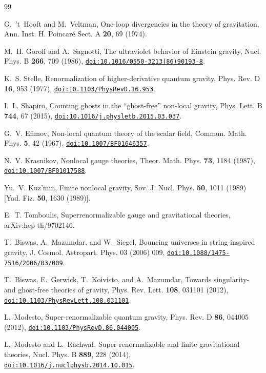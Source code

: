 \documentclass[a4paper,11pt]{article}
\newcommand{\doilink}[1]{\href{https://doi.org/#1}{\nolinkurl{doi:#1}}}
\begin{document}
\begin{thebibliography}{99}

G.~'t~Hooft and M.~Veltman, One-loop divergencies in the theory of gravitation, Ann. Inst. H. Poincar\'e Sect. A \textbf{20}, 69 (1974).

M.~H. Goroff and A.~Sagnotti, The ultraviolet behavior of Einstein gravity, Nucl. Phys. B \textbf{266}, 709 (1986), \doilink{10.1016/0550-3213(86)90193-8}.

K.~S. Stelle, Renormalization of higher-derivative quantum gravity, Phys. Rev. D \textbf{16}, 953 (1977), \doilink{10.1103/PhysRevD.16.953}.

I.~L. Shapiro, Counting ghosts in the ``ghost-free'' non-local gravity, Phys. Lett. B \textbf{744}, 67 (2015), \doilink{10.1016/j.physletb.2015.03.037}.

G.~V. Efimov, Non-local quantum theory of the scalar field, Commun. Math. Phys. \textbf{5}, 42 (1967), \doilink{10.1007/BF01646357}.

N.~V. Krasnikov, Nonlocal gauge theories, Theor. Math. Phys. \textbf{73}, 1184 (1987), \doilink{10.1007/BF01017588}.

Yu.~V. Kuz'min, Finite nonlocal gravity, Sov. J. Nucl. Phys. \textbf{50}, 1011 (1989) [Yad. Fiz. \textbf{50}, 1630 (1989)].

E.~T. Tomboulis, Superrenormalizable gauge and gravitational theories, arXiv:hep-th/9702146.

T.~Biswas, A.~Mazumdar, and W.~Siegel, Bouncing universes in string-inspired gravity, J. Cosmol. Astropart. Phys. 03 (2006) 009, \doilink{10.1088/1475-7516/2006/03/009}.

T.~Biswas, E.~Gerwick, T.~Koivisto, and A.~Mazumdar, Towards singularity- and ghost-free theories of gravity, Phys. Rev. Lett. \textbf{108}, 031101 (2012), \doilink{10.1103/PhysRevLett.108.031101}.

L.~Modesto, Super-renormalizable quantum gravity, Phys. Rev. D \textbf{86}, 044005 (2012), \doilink{10.1103/PhysRevD.86.044005}.

L.~Modesto and L.~Rachwa{\l}, Super-renormalizable and finite gravitational theories, Nucl. Phys. B \textbf{889}, 228 (2014), \doilink{10.1016/j.nuclphysb.2014.10.015}.


\end{thebibliography}
\end{document}
